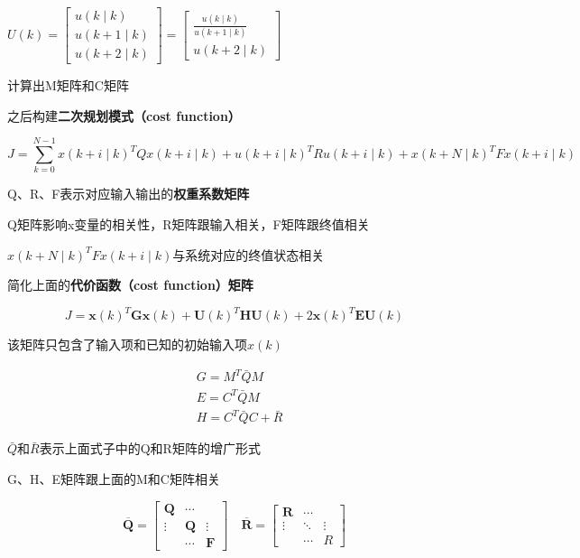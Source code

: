 $U(k)=\left[\begin{array}{c}u(k \mid k) \\u(k+1 \mid k) \\u(k+2 \mid k)\end{array}\right]=\left[\begin{array}{c}\frac{u(k \mid k)}{u(k+1 \mid k)} \\u(k+2 \mid k)\end{array}\right]$

计算出M矩阵和C矩阵

之后构建\textbf{二次规划模式（cost function）}\cite{ArtE7}

$$
J=\sum_{k=0}^{N-1} x(k+i \mid k)^{T} Q x(k+i \mid k)+u(k+i \mid k)^{T} R u(k+i \mid k)+x(k+N \mid k)^{T} F x(k+i \mid k)
$$

Q、R、F表示对应输入输出的\textbf{权重系数矩阵}

Q矩阵影响x变量的相关性，R矩阵跟输入相关，F矩阵跟终值相关

$x(k+N \mid k)^{T} F x(k+i \mid k)$与系统对应的终值状态相关

简化上面的\textbf{代价函数（cost function）矩阵}

$$
J=\boldsymbol{x}(k)^{T} \boldsymbol{G} \boldsymbol{x}(k)+\boldsymbol{U}(k)^{T} \boldsymbol{H} \boldsymbol{U}(k)+2 \boldsymbol{x}(k)^{T} \boldsymbol{E} \boldsymbol{U}(k)
$$

该矩阵只包含了输入项和已知的初始输入项$x(k)$

$$
\begin{aligned}&G=M^{T} \bar{Q} M \\&E=C^{T} \bar{Q} M \\&H=C^{T} \bar{Q} C+\bar{R}\end{aligned}
$$

$\bar{Q}$和$\bar{R}$表示上面式子中的Q和R矩阵的增广形式

G、H、E矩阵跟上面的M和C矩阵相关

$$
\overline{\boldsymbol{Q}}=\left[\begin{array}{ccc}\boldsymbol{Q} & \cdots & \\\vdots & \boldsymbol{Q} & \vdots \\& \cdots & \boldsymbol{F}\end{array}\right] \quad \overline{\boldsymbol{R}}=\left[\begin{array}{ccc}\boldsymbol{R} & \cdots & \\\vdots & \ddots & \vdots \\& \cdots & R\end{array}\right]
$$

